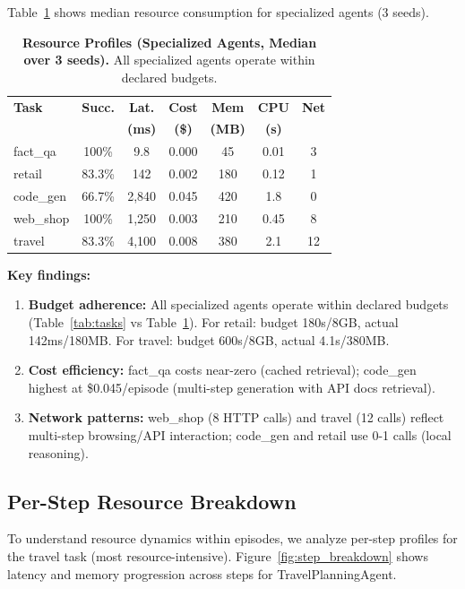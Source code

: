 \documentclass[letterpaper, 10 pt, conference]{ieeeconf}
\begin{document}
Table~\ref{tab:resource_profiles} shows median resource consumption for specialized agents (3 seeds).

\begin{table}[t]
\centering
\caption{\textbf{Resource Profiles (Specialized Agents, Median over 3 seeds).} All specialized agents operate within declared budgets.}
\label{tab:resource_profiles}
\footnotesize
\setlength{\tabcolsep}{3.5pt}
\begin{tabular}{lcccccc}
\toprule
\textbf{Task} & \textbf{Succ.} & \textbf{Lat.} & \textbf{Cost} & \textbf{Mem} & \textbf{CPU} & \textbf{Net} \\
 & & \textbf{(ms)} & \textbf{(\$)} & \textbf{(MB)} & \textbf{(s)} & \\
\midrule
fact\_qa & 100\% & 9.8 & 0.000 & 45 & 0.01 & 3 \\
retail & 83.3\% & 142 & 0.002 & 180 & 0.12 & 1 \\
code\_gen & 66.7\% & 2,840 & 0.045 & 420 & 1.8 & 0 \\
web\_shop & 100\% & 1,250 & 0.003 & 210 & 0.45 & 8 \\
travel & 83.3\% & 4,100 & 0.008 & 380 & 2.1 & 12 \\
\bottomrule
\end{tabular}
\end{table}

\textbf{Key findings:}
\begin{enumerate}
    \item \textbf{Budget adherence:} All specialized agents operate within declared budgets (Table~\ref{tab:tasks} vs Table~\ref{tab:resource_profiles}). For retail: budget 180s/8GB, actual 142ms/180MB. For travel: budget 600s/8GB, actual 4.1s/380MB.
    \item \textbf{Cost efficiency:} fact\_qa costs near-zero (cached retrieval); code\_gen highest at \$0.045/episode (multi-step generation with API docs retrieval).
    \item \textbf{Network patterns:} web\_shop (8 HTTP calls) and travel (12 calls) reflect multi-step browsing/API interaction; code\_gen and retail use 0-1 calls (local reasoning).
\end{enumerate}

\subsection{Per-Step Resource Breakdown}
\label{sec:per_step}

To understand resource dynamics within episodes, we analyze per-step profiles for the travel task (most resource-intensive). Figure~\ref{fig:step_breakdown} shows latency and memory progression across steps for TravelPlanningAgent.
\end{document}
